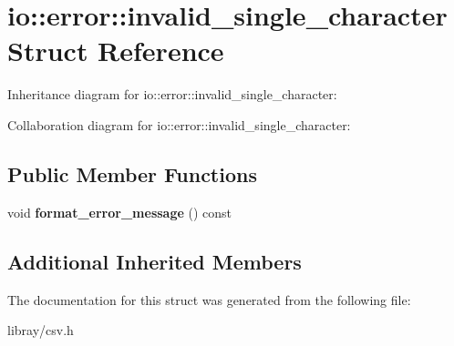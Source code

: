 \hypertarget{structio_1_1error_1_1invalid__single__character}{}\section{io\+:\+:error\+:\+:invalid\+\_\+single\+\_\+character Struct Reference}
\label{structio_1_1error_1_1invalid__single__character}


Inheritance diagram for io\+:\+:error\+:\+:invalid\+\_\+single\+\_\+character\+:


Collaboration diagram for io\+:\+:error\+:\+:invalid\+\_\+single\+\_\+character\+:
\subsection*{Public Member Functions}
\begin{DoxyCompactItemize}
\item 
\mbox{\label{structio_1_1error_1_1invalid__single__character_a074ab35a8013ad15041a9bb9188e69bf}} 
void {\bfseries format\+\_\+error\+\_\+message} () const
\end{DoxyCompactItemize}
\subsection*{Additional Inherited Members}


The documentation for this struct was generated from the following file\+:\begin{DoxyCompactItemize}
\item 
libray/csv.\+h\end{DoxyCompactItemize}
